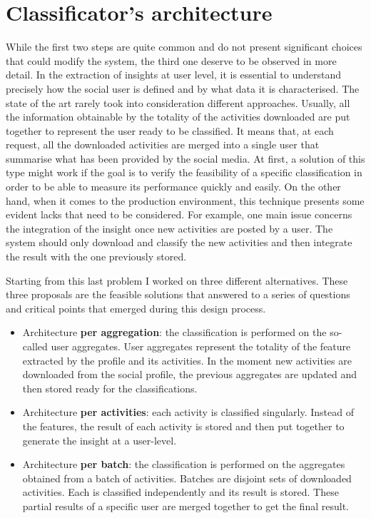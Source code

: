 \section{Classificator's architecture}
\label{sec:systemArch}
While the first two steps are quite common and do not present significant choices that could modify the system, the third one deserve to be observed in more detail.
In the extraction of insights at user level, it is essential to understand precisely how the social user is defined and by what data it is characterised.
The state of the art rarely took into consideration different approaches. Usually, all the information obtainable by the totality of the activities downloaded are put together to represent the user ready to be classified.
It means that, at each request, all the downloaded activities are merged into a single user that summarise what has been provided by the social media.
At first, a solution of this type might work if the goal is to verify the feasibility of a specific classification in order to be able to measure its performance quickly and easily.
On the other hand, when it comes to the production environment, this technique presents some evident lacks that need to be considered.
For example, one main issue concerns the integration of the insight once new activities are posted by a user. %
The system should only download and classify the new activities and then integrate the result with the one previously stored.

Starting from this last problem I worked on three different alternatives. These three proposals are the feasible solutions that answered to a series of questions and critical points that emerged during this design process. 
\begin{itemize}
    \item Architecture \textbf{per aggregation}: the classification is performed on the so-called user aggregates. User aggregates represent the totality of the feature extracted by the profile and its activities. In the moment new activities are downloaded from the social profile, the previous aggregates are updated and then stored ready for the classifications.
    \item Architecture \textbf{per activities}: each activity is classified singularly. Instead of the features, the result of each activity is stored and then put together to generate the insight at a user-level.
    \item Architecture \textbf{per batch}: the classification is performed on the aggregates obtained from a batch of activities. Batches are disjoint sets of downloaded activities. Each is classified independently and its result is stored. These partial results of a specific user are merged together to get the final result. 
\end{itemize}

